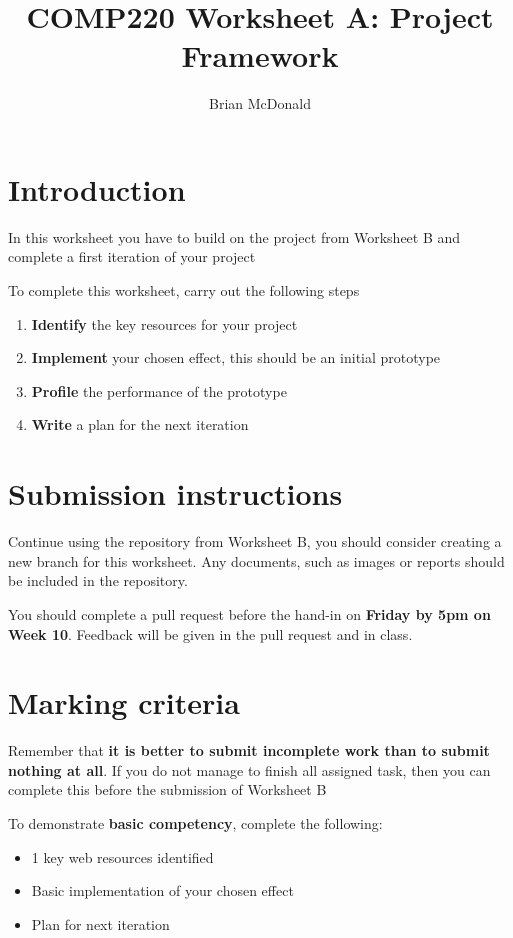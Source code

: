 \documentclass{../../../fal_assignment}
\title{COMP220 Worksheet A: Project Framework}
\author{Brian McDonald}
\begin{document}
\maketitle

\section*{Introduction}

In this worksheet you have to build on the project from Worksheet B and complete a first iteration of your project

To complete this worksheet, carry out the following steps
\begin{enumerate}[label=(\alph*)]
	\item \textbf{Identify} the key resources for your project
	\item \textbf{Implement} your chosen effect, this should be an initial prototype
	\item \textbf{Profile} the performance of the prototype
	\item \textbf{Write} a plan for the next iteration
\end{enumerate}

\section*{Submission instructions}

Continue using the repository from Worksheet B, you should consider creating a new branch for this worksheet. Any documents, such as images or reports should be included in the repository.

You should complete a pull request before the hand-in on \textbf{Friday by 5pm on Week 10}. Feedback will be given in the pull request and in class.

\section*{Marking criteria}

Remember that \textbf{it is better to submit incomplete work than to submit nothing at all}. If you do not manage to finish all assigned task, then you can complete this before the submission of Worksheet B

To demonstrate \textbf{basic competency}, complete the following:
\begin{itemize}
	\item 1 key web resources identified
	\item Basic implementation of your chosen effect
	\item Plan for next iteration
\end{itemize} 
\end{document}
